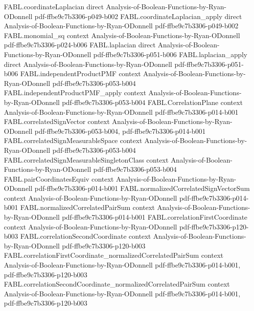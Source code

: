 \begin{theorem}
  {FABL.coordinateLaplacian}
  {direct}
  {Analysis-of-Boolean-Functions-by-Ryan-ODonnell}
  {pdf-ffbe9c7b3306-p049-b002}
\proofstep
  {FABL.coordinateLaplacian_apply}
  {direct}
  {Analysis-of-Boolean-Functions-by-Ryan-ODonnell}
  {pdf-ffbe9c7b3306-p049-b002}
\proofstep
  {FABL.monomial_sq}
  {context}
  {Analysis-of-Boolean-Functions-by-Ryan-ODonnell}
  {pdf-ffbe9c7b3306-p024-b006}
\proofstep
  {FABL.laplacian}
  {direct}
  {Analysis-of-Boolean-Functions-by-Ryan-ODonnell}
  {pdf-ffbe9c7b3306-p051-b006}
\proofstep
  {FABL.laplacian_apply}
  {direct}
  {Analysis-of-Boolean-Functions-by-Ryan-ODonnell}
  {pdf-ffbe9c7b3306-p051-b006}
\proofstep
  {FABL.independentProductPMF}
  {context}
  {Analysis-of-Boolean-Functions-by-Ryan-ODonnell}
  {pdf-ffbe9c7b3306-p053-b004}
\proofstep
  {FABL.independentProductPMF_apply}
  {context}
  {Analysis-of-Boolean-Functions-by-Ryan-ODonnell}
  {pdf-ffbe9c7b3306-p053-b004}
\proofstep
  {FABL.CorrelationPlane}
  {context}
  {Analysis-of-Boolean-Functions-by-Ryan-ODonnell}
  {pdf-ffbe9c7b3306-p014-b001}
\proofstep
  {FABL.correlatedSignVector}
  {context}
  {Analysis-of-Boolean-Functions-by-Ryan-ODonnell}
  {pdf-ffbe9c7b3306-p053-b004,
    pdf-ffbe9c7b3306-p014-b001}
\proofstep
  {FABL.correlatedSignMeasurableSpace}
  {context}
  {Analysis-of-Boolean-Functions-by-Ryan-ODonnell}
  {pdf-ffbe9c7b3306-p053-b004}
\proofstep
  {FABL.correlatedSignMeasurableSingletonClass}
  {context}
  {Analysis-of-Boolean-Functions-by-Ryan-ODonnell}
  {pdf-ffbe9c7b3306-p053-b004}
\proofstep
  {FABL.pairCoordinatesEquiv}
  {context}
  {Analysis-of-Boolean-Functions-by-Ryan-ODonnell}
  {pdf-ffbe9c7b3306-p014-b001}
\proofstep
  {FABL.normalizedCorrelatedSignVectorSum}
  {context}
  {Analysis-of-Boolean-Functions-by-Ryan-ODonnell}
  {pdf-ffbe9c7b3306-p014-b001}
\proofstep
  {FABL.normalizedCorrelatedPairSum}
  {context}
  {Analysis-of-Boolean-Functions-by-Ryan-ODonnell}
  {pdf-ffbe9c7b3306-p014-b001}
\proofstep
  {FABL.correlationFirstCoordinate}
  {context}
  {Analysis-of-Boolean-Functions-by-Ryan-ODonnell}
  {pdf-ffbe9c7b3306-p120-b003}
\proofstep
  {FABL.correlationSecondCoordinate}
  {context}
  {Analysis-of-Boolean-Functions-by-Ryan-ODonnell}
  {pdf-ffbe9c7b3306-p120-b003}
\proofstep
  {FABL.correlationFirstCoordinate_normalizedCorrelatedPairSum}
  {context}
  {Analysis-of-Boolean-Functions-by-Ryan-ODonnell}
  {pdf-ffbe9c7b3306-p014-b001,
    pdf-ffbe9c7b3306-p120-b003}
\proofstep
  {FABL.correlationSecondCoordinate_normalizedCorrelatedPairSum}
  {context}
  {Analysis-of-Boolean-Functions-by-Ryan-ODonnell}
  {pdf-ffbe9c7b3306-p014-b001,
    pdf-ffbe9c7b3306-p120-b003}

\end{theorem}
